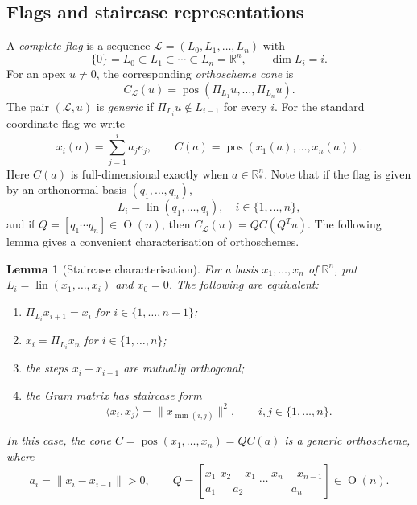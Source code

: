\documentclass[11pt]{article}
\DeclareMathOperator{\pos}{pos}
\newcommand{\R}{\mathbb{R}}
\newcommand{\On}[1]{\operatorname{O}(#1)}
\newcommand{\lin}{\operatorname{lin}}
\newtheorem{lemma}[theorem]{Lemma}
\begin{document}
\subsection{Flags and staircase representations}\label{subsec:orthosch-basic}
A \emph{complete flag} is a sequence
$\mathcal L=(L_0,L_1,\ldots,L_n)$ with
\[
 \{0\}=L_0\subset L_1\subset\cdots\subset L_n=\R^n,
 \qquad\dim L_i=i.
\]
For an apex $u\ne0$, the corresponding \emph{orthoscheme cone} is
\begin{equation}\label{eq:flag-orthoscheme}
 C_{\mathcal L}(u)=\pos(\Pi_{L_1}u,\ldots,\Pi_{L_n}u).
\end{equation}
The pair $(\mathcal L,u)$ is \emph{generic} if
$\Pi_{L_i}u\notin L_{i-1}$ for every $i$. For the standard coordinate
flag we write
\begin{equation}\label{eq:C(a)}
 x_i(a)=\sum_{j=1}^i a_je_j,\qquad
 C(a)=\pos(x_1(a),\ldots,x_n(a)).
\end{equation}
Here $C(a)$ is full-dimensional exactly when $a\in\R_*^n$. Note that if the flag is given by an orthonormal basis $(q_1,\dots,q_n)$,
\begin{equation*}
  L_i = \lin(q_1,\dots,q_i), \quad i\in \{1,\dots,n\},
\end{equation*}
and if $Q=[q_1 \cdots q_n]\in \On n$, then $C_{\mathcal L}(u)=QC(Q^Tu)$. 
The following lemma gives a convenient characterisation of orthoschemes.

\begin{lemma}[Staircase characterisation]\label{lem:staircase-representation}
For a basis $x_1,\ldots,x_n$ of $\R^n$, put
$L_i=\lin(x_1,\ldots,x_i)$ and $x_0=0$. The following are equivalent:
\begin{enumerate}
 \item $\Pi_{L_i}x_{i+1}=x_i$ for $i\in \{1,\dots,n-1\}$;
 \item $x_i=\Pi_{L_i}x_n$ for $i\in \{1,\dots,n\}$;
 \item the steps $x_i-x_{i-1}$ are mutually orthogonal;
 \item the Gram matrix has staircase form
 \begin{equation}\label{eq:staircase-gram}
  \langle x_i,x_j\rangle=\|x_{\min(i,j)}\|^2,
  \qquad i,j\in\{1,\dots,n\}.
 \end{equation}
\end{enumerate}
In this case, the cone $C=\pos(x_1,\ldots,x_n)=QC(a)$ is a generic orthoscheme, where
\begin{equation}\label{eq:staircase-parameters}
 a_i=\|x_i-x_{i-1}\|>0,\qquad
 Q=\left[\frac{x_1}{a_1}\ \frac{x_2-x_1}{a_2}\ \cdots\
                 \frac{x_n-x_{n-1}}{a_n}\right]\in\On n.
\end{equation}
\end{lemma}
\end{document}
